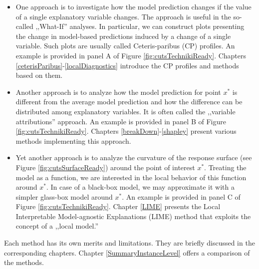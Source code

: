 \documentclass[12pt,]{krantz}
\providecommand{\tightlist}{%
  \setlength{\itemsep}{0pt}\setlength{\parskip}{0pt}}
\theoremstyle{definition}
\theoremstyle{definition}
\theoremstyle{definition}
\theoremstyle{remark}
\begin{document}
\begin{itemize}
\tightlist
\item
  One approach is to investigate how the model prediction changes if the
  value of a single explanatory variable changes. The approach is useful
  in the so-called ,,What-If'' analyses. In particular, we can construct
  plots presenting the change in model-based predictions induced by a
  change of a single variable. Such plots are usually called
  Ceteris-paribus (CP) profiles. An example is provided in panel A of
  Figure \ref{fig:cutsTechnikiReady}. Chapters
  \ref{ceterisParibus}-\ref{localDiagnostics} introduce the CP profiles
  and methods based on them.\\
\item
  Another approach is to analyze how the model prediction for point
  \(x^*\) is different from the average model prediction and how the
  difference can be distributed among explanatory variables. It is often
  called the ,,variable attributions'' approach. An example is provided
  in panel B of Figure \ref{fig:cutsTechnikiReady}. Chapters
  \ref{breakDown}-\ref{shapley} present various methods implementing
  this approach.
\item
  Yet another approach is to analyze the curvature of the response
  surface (see Figure \ref{fig:cutsSurfaceReady}) around the point of
  interest \(x^*\). Treating the model as a function, we are interested
  in the local behavior of this function around \(x^*\). In case of a
  black-box model, we may approximate it with a simpler glass-box model
  around \(x^*\). An example is provided in panel C of Figure
  \ref{fig:cutsTechnikiReady}. Chapter \ref{LIME} presents the Local
  Interpretable Model-agnostic Explanations (LIME) method that exploits
  the concept of a ,,local model.''
\end{itemize}

Each method has its own merits and limitations. They are briefly
discussed in the corresponding chapters. Chapter
\ref{SummaryInstanceLevel} offers a comparison of the methods.
\end{document}
